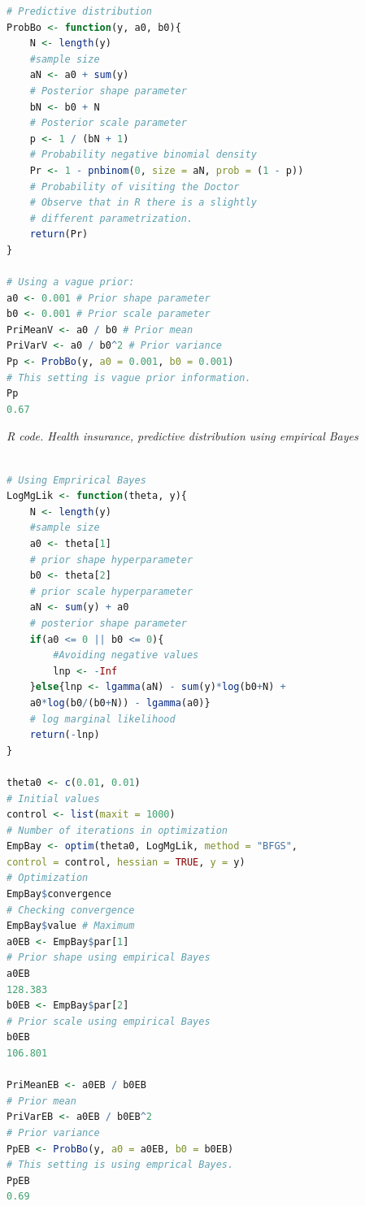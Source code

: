 \begin{enumerate}[leftmargin=*]
\begin{tcolorbox}[enhanced,width=4.67in,center upper,
	fontupper=\large\bfseries,drop shadow southwest,sharp corners]
\begin{VF}
\begin{lstlisting}[basicstyle=\footnotesize, language=R]
# Predictive distribution
ProbBo <- function(y, a0, b0){
	N <- length(y) 
	#sample size
	aN <- a0 + sum(y) 
	# Posterior shape parameter
	bN <- b0 + N 
	# Posterior scale parameter
	p <- 1 / (bN + 1) 
	# Probability negative binomial density
	Pr <- 1 - pnbinom(0, size = aN, prob = (1 - p)) 
	# Probability of visiting the Doctor
	# Observe that in R there is a slightly 
	# different parametrization.
	return(Pr)
} 

# Using a vague prior:
a0 <- 0.001 # Prior shape parameter
b0 <- 0.001 # Prior scale parameter
PriMeanV <- a0 / b0 # Prior mean
PriVarV <- a0 / b0^2 # Prior variance
Pp <- ProbBo(y, a0 = 0.001, b0 = 0.001) 
# This setting is vague prior information.
Pp
0.67
\end{lstlisting}
\end{VF}
\end{tcolorbox}


\begin{tcolorbox}[enhanced,width=4.67in,center upper,
	fontupper=\large\bfseries,drop shadow southwest,sharp corners]
	\textit{R code. Health insurance, predictive distribution using empirical Bayes}
\begin{VF}
\begin{lstlisting}[basicstyle=\footnotesize, language=R]
	
# Using Emprirical Bayes
LogMgLik <- function(theta, y){
	N <- length(y) 
	#sample size
	a0 <- theta[1] 
	# prior shape hyperparameter
	b0 <- theta[2] 
	# prior scale hyperparameter
	aN <- sum(y) + a0 
	# posterior shape parameter
	if(a0 <= 0 || b0 <= 0){ 
		#Avoiding negative values
		lnp <- -Inf
	}else{lnp <- lgamma(aN) - sum(y)*log(b0+N) + 
	a0*log(b0/(b0+N)) - lgamma(a0)} 
    # log marginal likelihood
	return(-lnp)
}

theta0 <- c(0.01, 0.01) 
# Initial values
control <- list(maxit = 1000) 
# Number of iterations in optimization
EmpBay <- optim(theta0, LogMgLik, method = "BFGS", 
control = control, hessian = TRUE, y = y) 
# Optimization
EmpBay$convergence 
# Checking convergence
EmpBay$value # Maximum
a0EB <- EmpBay$par[1] 
# Prior shape using empirical Bayes
a0EB
128.383
b0EB <- EmpBay$par[2] 
# Prior scale using empirical Bayes
b0EB 
106.801

PriMeanEB <- a0EB / b0EB 
# Prior mean
PriVarEB <- a0EB / b0EB^2 
# Prior variance
PpEB <- ProbBo(y, a0 = a0EB, b0 = b0EB) 
# This setting is using emprical Bayes.
PpEB
0.69
\end{lstlisting}
\end{VF}
\end{tcolorbox}


\end{enumerate}
